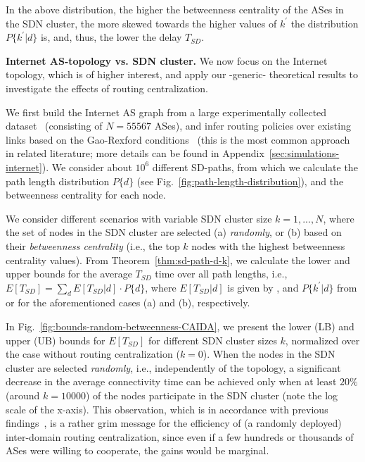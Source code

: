 In the above distribution, the higher the betweenness centrality of the ASes in the SDN cluster, the more skewed towards the higher values of $k^{'}$ the distribution $P\{k^{'}|d\}$ is, and, thus, the lower the delay $T_{SD}$.


\textbf{Internet AS-topology vs. SDN cluster.} We now focus on the Internet topology, which is of higher interest, and apply our -generic- theoretical results to investigate the effects of routing centralization.

We first build the Internet AS graph from a large experimentally collected dataset~\cite{AS-relationships-dataset} (consisting of $N=55567$ ASes), and infer routing policies over existing links based on the Gao-Rexford conditions~\cite{stable-internet-routing-TON-2001} (this is the most common approach in related literature; more details can be found in Appendix~\ref{sec:simulations-internet}). We consider about $10^{6}$ different SD-paths, from which we calculate the path length distribution $P\{d\}$ (see Fig.~\ref{fig:path-length-distribution}), and the betweenness centrality for each node.

We consider different scenarios with variable SDN cluster size $k = 1, ..., N$, where the set of nodes in the SDN cluster are selected (a) \textit{randomly}, or (b) based on their \textit{betweenness centrality} (i.e., the top $k$ nodes with the highest betweenness centrality values). From Theorem~\ref{thm:sd-path-d-k}, we calculate the lower and upper bounds for the average $T_{SD}$ time over all path lengths, i.e., $E[T_{SD}] = \sum_{d}E[T_{SD}|d]\cdot P\{d\}$, where $E[T_{SD}|d]$ is given by , and $P\{k^{'}|d\}$ from  or  for the aforementioned cases (a) and (b), respectively.

In Fig.~\ref{fig:bounds-random-betweenness-CAIDA}, we present the lower (LB) and upper (UB) bounds for $E[T_{SD}]$ for different SDN cluster sizes $k$, normalized over the case without routing centralization ($k=0$). When the nodes in the SDN cluster are selected \textit{randomly}, i.e., independently of the topology, a significant decrease in the average connectivity time can be achieved only when at least $20\%$ (around $k=10000$) of the nodes participate in the SDN cluster (note the log scale of the x-axis). This observation, which is in accordance with previous findings~\cite{Kotronis-Routing-Centralization-ComNets-2015}, is a rather grim message for the efficiency of (a randomly deployed) inter-domain routing centralization, since even if a few hundreds or thousands of ASes were willing to cooperate, the gains would be marginal.

